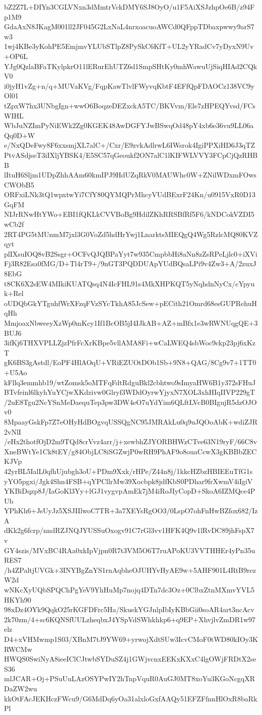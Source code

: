 bZ2Z7L+DIYn3CGLVNxn3dMmtrVckDMY6SJ8OyO/u1F5AiXSJzhpOe6B/z94Fp1M9
GdaAxN8JKagM001ll2JF045G2LxNaL4nrxoacuoAWCd0QFppTDbaxpwwy9arS7w3
1wj4KBe3yKohPE5EmjmvYLUbSTlpZ8PySkC6KfT+UL2yYRadCv7yDyxN9Uv+OP6L
YJg0QzlaBFaTKylpkrO11lERurEhUTZ6d1SmpSHtKy0mhWawuUjSiqHIAd2CQkV0
i0jyH1vZg+n/q+MUVaKVg/FqpKawTlvlFWyvqKbtF4EFfQpFDAOCz138VC9yOl01
tZpxW7hx3UNbgIgn+wwO6BoqzeDEZxckA5TC/BKVvm/Ele7zHPEQYvsd/FCsWIHL
WbJuNZImPyNiEWk2Zg0KGEK48AwDGFYJwBSwqOd48pY4xb6e36vu9LL06aQq0D+W
e/NxQDeFwy8F6xxsmjXL7alC+/Cxr/E9zvkAdlrwL6IWsrok4IgiPPXiHD6J3qTZ
PtvASdjseT3iIXljYBSK4/E5SC57qGeoukf2ON7alC1lKIFWLVVY3FCpCjQzRHBB
lItuH6Sljm1UDpZhhAAm60kmIPJ9HdUZqRkV0MAUWhc0W+ZNilWDxmFOwsCWObB5
ORFxiLNk3tQ1wpxtwYi7CfY80QYMQPrMhcyVUdBExrF24Kn/u0915VxR0D13GqFM
NIJrRNwHtYWo+EBI1fQKLkCVVBoBg9HdilZKhRRSBfRf5F6/kNDCokVZDI5wCb2f
2RT4PG5tMUnmM7jxl3G0VoZd5hdHrYwj1LnarktsMIEQgQ4Wg5RzlcMQ80KVZqyt
plIXsuIOQ8vB2Ssgr+OCFvQJQBPaYyt7w935CmpbbHi8aNn8zZsRPeLjlc0+iXVi
Fj3R82Esa0fMG/D+Tl4rT9+/9nGT3PQDDUApYUdBQsaLPi9v4Zw3+A/2zuxJ8EbG
t8CK6X2sEW4MIkiKUATQsq4N4IcFHL91s4MkXHPKQT5yNqhdnNyCx/cYpyuk+Rel
oUDQbGkYTguhfWrXFzqFVzSYcTkhA85JcSew+pECith21Omrd68esGUPRehuHqHh
MmjoaxNbweeyXzWp0mKcy1If1BcOB5jI4IJkAB+AZ+mBfx1e3wRWNUqgQE+3BUJ6
3ifKj6THXVPLLZjzPfrFcXrKBpe5vllAMA8Fi+wCaLWEQ4sbWoc9ckp23pj6xKzT
gK6BS3gAstdl/EoPF4HlAOqU+VRiEZUOtDOb1Sb+9N8+QAG/8Cg9v7+1TT0+U5Ao
kFllq3emmhb19/wtZomsk5oMTFqFdtRdguBkl2cbhtwo9sImyaHW6B1y372sFHuJ
BTvfeinl6lkyhYuYCjwXKdzivw0Glryf3WDdOyrwYjyxN7XOL3xhHIqIIVP229gT
/2uE8Tgu2NcYSnMeDaequTep3pw3DW4eO7uYdYim6QLftLVcB0BIgujR5dzOJOv0
8MpaayGskFp7Z7eOHyHdBOgvqUSSQgNC95JMRAkLu0q9uJQOoAbK+wdiZJR2vNlI
/eHx2thotfOjD2m9TQd8crVvz4arr/j+xewbhZJYORBHWzCTve63N19ryF/66C8v
XneBWtYe1Ck8tEY/g84ObjLC8iSGZwjP0wRH9PhAF9o8ouaCcwX3gKBBbZECKJVp
42yrBL5IalL0qfhUjubgh3oU+PDm9Xxk/rHPe/Z44n8j/1kkcHZbzHBIEEuTfG1s
yYO5pgxi/Jgk4Shn4FSB+qYPCllrMw39Xocbpk8jdfKbS0PDhar9frXwmV4iIgiV
YKBiDqzp8J/IaGoKl3Yy+lGJ1vygvpAmEk7jM4iRoJIyCopD+SkoA6IZMQce4PUb
YPhKh6+JsUyJz5XSJIIlwoC7TR+3a7XEYsRgOO3/0LspO7ohFnHwBZfox682/IzA
dKk2g6fcrp/nndRZJNQJYUSSuOxogv91C7rGl3vv1HFK4Q9v1lRvDC89jhFspX7v
GY4szis/MVxBC4RAa0xkIpVjpn0R7t3VM5O6T7ruAPoKU3VVTHHEr4yPn35uRES7
/h4ZPaltjUVGk+3INYBgZnYS1rnAqbheOJUHYvHyAE9w+5AHF901L4RtB9rezW2d
wNKcXyUQbSPQChPgYeV9YhHuMp7nojq4DTn7dc3Oz+0ClbxZtnMXmvYVL5HKYh90
98xDz4OYk9QqkO25rKGFDFrc5Ha/SkuekYGJnlpIbIyKBbGii0soAR4art3ncAcv
2k70zm/4+sc6KQNSfUULzheqbxJ4YSpVdSWhkhkp6+q9EP+XhvjlvZmDR1w97elz
D4+xVHMwmp1S03/XBnM7tJ9YW69+yrwojXdtSUw3IcvCMoF0tWD80kIOy3KRWCMw
HWQS0SwiNyA8ieeIClCJtwbSYDuSZ4j1GWjvcnxEEKxKXxC4lgOWjFRDtX2seS36
mlJCAR+Oj+PSuUuLAzOSYPwIY2hTnpVquR0AuGJ0MT8xoYu3KGoNcgqXRDaZW2wu
kkOtFAcJEKHczFWcu9/G6MdDq6yOa31alxloGxfAAQy51EFZFfnnHlOxR8baRkPl
